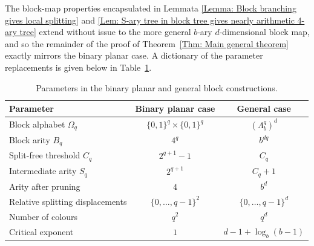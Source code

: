 \documentclass[11pt]{amsart}
\theoremstyle{plain}
\theoremstyle{definition}
\theoremstyle{remark}
\begin{document}
The block-map properties encapsulated in Lemmata \ref{Lemma: Block branching gives local splitting} and \ref{Lem: S-ary tree in block tree gives nearly arithmetic 4-ary tree} extend without issue to the more general $b$-ary $d$-dimensional block map, and so the remainder of the proof of Theorem~\ref{Thm: Main general theorem} exactly mirrors the binary planar case. A dictionary of the parameter replacements is given below in Table~\ref{Table: Parameter replacements}.



\begin{table}[H]
    \centering
    \small
    \renewcommand{\arraystretch}{1.2}
    \begin{tabular}{@{}lcc@{}}
        \toprule
        Parameter
        & Binary planar case
        & General case \\
        \midrule
        Block alphabet $\Omega_q$
        & $\{0,1\}^q\times \{0,1\}^q$
        & $(\Lambda_b^q)^d$ \\

        Block arity $B_q$
        & $4^q$
        & $b^{dq}$ \\

        Split-free threshold $C_q$
        & $2^{q+1}-1$
        & $C_q$ \\

        Intermediate arity $S_q$
        & $2^{q+1}$
        & $C_q+1$ \\

        Arity after pruning
        & $4$
        & $b^d$ \\

        Relative splitting displacements
        & $\{0,\ldots,q-1\}^2$
        & $\{0,\ldots,q-1\}^d$ \\

        Number of colours
        & $q^2$
        & $q^d$ \\

        Critical exponent
        & $1$
        & $d-1+\log_b(b-1)$ \\
        \bottomrule
    \end{tabular}
    \caption{Parameters in the binary planar and general block
    constructions.}
    \label{Table: Parameter replacements}
\end{table}
\end{document}
